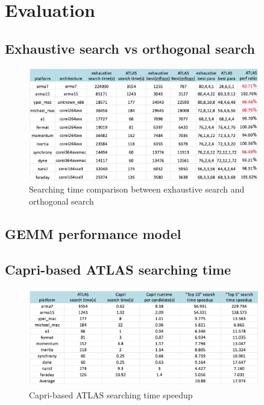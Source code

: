 \section{Evaluation}
\label{sec:evaluation}

  \subsection{Exhaustive search vs \atl orthogonal search}
  \label{sec:exhaustiveVSorthogonal}

  \begin{figure}[tbhp]
    \centering
    \includegraphics[width=0.9\textwidth]{images/exhaustiveVsorthogonal.png}
    \caption{Searching time comparison between exhaustive search and \atl orthogonal search}
    \label{fig:exhaustiveVsorthogonal}
  \end{figure}

  \subsection{GEMM performance model}
  \label{sec:GEMMperf}

  \subsection{Capri-based ATLAS searching time}
  \label{sec:capri_atlas_searching}

  \begin{figure}[tbhp]
    \centering
    \includegraphics[width=0.9\textwidth]{images/timespeedup.png}
    \caption{Capri-based ATLAS searching time speedup}
    \label{fig:platforms}
  \end{figure}

